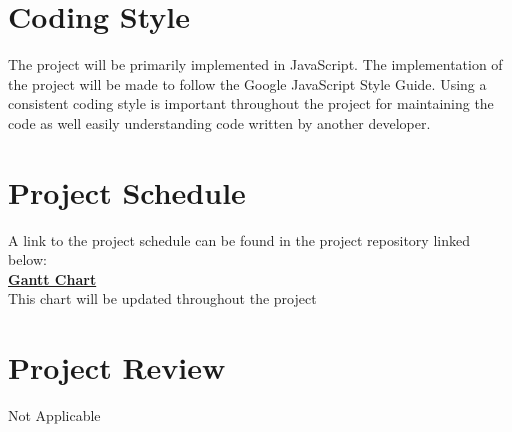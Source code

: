 \documentclass{article}
\begin{document}
\section{Coding Style}

The project will be primarily implemented in JavaScript. The implementation of the project will be made to follow the Google JavaScript Style Guide. Using a consistent coding style is important throughout the project for maintaining the code as well easily understanding code written by another developer.  

\section{Project Schedule}
A link to the project schedule can be found in the project repository linked below:\\

\href{https://gitlab.cas.mcmaster.ca/chowdr11/3xa3/-/tree/master/BlankProjectTemplate/ProjectSchedule}
{\textbf{Gantt Chart}}\\

\noindent This chart will be updated throughout the project

\section{Project Review}
Not Applicable 
\end{document}
